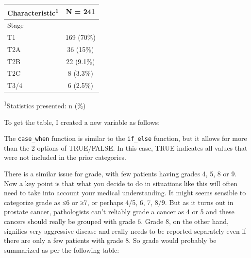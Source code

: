 \documentclass[]{book}
\newenvironment{Shaded}{\begin{snugshade}}{\end{snugshade}}
\newcommand{\DataTypeTok}[1]{\textcolor[rgb]{0.13,0.29,0.53}{#1}}
\newcommand{\KeywordTok}[1]{\textcolor[rgb]{0.13,0.29,0.53}{\textbf{#1}}}
\newcommand{\NormalTok}[1]{#1}
\newcommand{\OperatorTok}[1]{\textcolor[rgb]{0.81,0.36,0.00}{\textbf{#1}}}
\newcommand{\OtherTok}[1]{\textcolor[rgb]{0.56,0.35,0.01}{#1}}
\newcommand{\StringTok}[1]{\textcolor[rgb]{0.31,0.60,0.02}{#1}}
\begin{document}
\captionsetup[table]{labelformat=empty,skip=1pt}
\begin{longtable}{lc}
\toprule
\textbf{Characteristic}\textsuperscript{1} & \textbf{N = 241} \\ 
\midrule
Stage &  \\ 
T1 & 169 (70\%) \\ 
T2A & 36 (15\%) \\ 
T2B & 22 (9.1\%) \\ 
T2C & 8 (3.3\%) \\ 
T3/4 & 6 (2.5\%) \\ 
\bottomrule
\end{longtable}
\vspace{-5mm}
\begin{minipage}{\linewidth}
\textsuperscript{1}Statistics presented: n (\%) \\ 
\end{minipage}

To get the table, I created a new variable as follows:

\begin{Shaded}
\end{Shaded}

The \texttt{case\_when} function is similar to the \texttt{if\_else} function, but it allows for more than the 2 options of TRUE/FALSE. In this case, TRUE indicates all values that were not included in the prior categories.

There is a similar issue for grade, with few patients having grades 4, 5, 8 or 9. Now a key point is that what you decide to do in situations like this will often need to take into account your medical understanding. It might seems sensible to categorize grade as ≤6 or ≥7, or perhaps 4/5, 6, 7, 8/9. But as it turns out in prostate cancer, pathologists can't reliably grade a cancer as 4 or 5 and these cancers should really be grouped with grade 6. Grade 8, on the other hand, signifies very aggressive disease and really needs to be reported separately even if there are only a few patients with grade 8. So grade would probably be summarized as per the following table:
\end{document}
